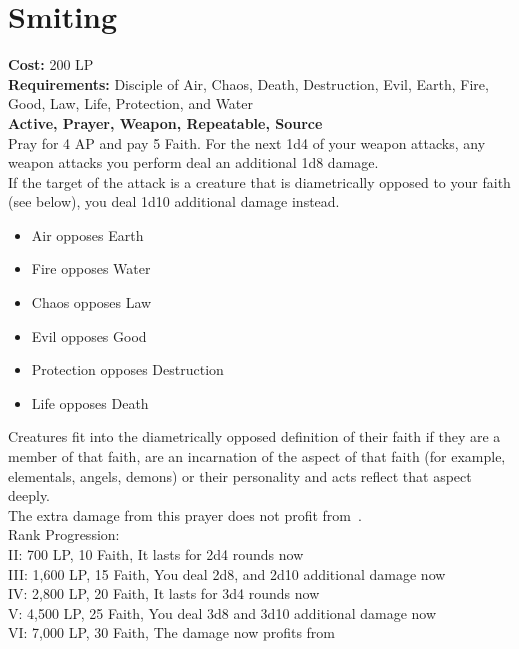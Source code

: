 \section{Smiting}\label{prayer:smiting}
\textbf{Cost:} 200 LP\\
\textbf{Requirements:} Disciple of Air, Chaos, Death, Destruction, Evil, Earth, Fire, Good, Law, Life, Protection, and Water\\
\textbf{Active, Prayer, Weapon, Repeatable, Source}\\
Pray for 4 AP and pay 5 Faith.
For the next 1d4 of your weapon attacks, any weapon attacks you perform deal an additional 1d8 damage.\\
If the target of the attack is a creature that is diametrically opposed to your faith (see below), you deal 1d10 additional damage instead.\\
\begin{itemize}
    \item Air opposes Earth
    \item Fire opposes Water
    \item Chaos opposes Law
    \item Evil opposes Good
    \item Protection opposes Destruction
    \item Life opposes Death
\end{itemize}
Creatures fit into the diametrically opposed definition of their faith if they are a member of that faith, are an incarnation of the aspect of that faith (for example, elementals, angels, demons) or their personality and acts reflect that aspect deeply.\\
The extra damage from this prayer does not profit from~.
\\
Rank Progression:\\
II: 700 LP, 10 Faith, It lasts for 2d4 rounds now\\
III: 1,600 LP, 15 Faith, You deal 2d8, and 2d10 additional damage now\\
IV: 2,800 LP, 20 Faith, It lasts for 3d4 rounds now\\
V: 4,500 LP, 25 Faith, You deal 3d8 and 3d10 additional damage now\\
VI: 7,000 LP, 30 Faith, The damage now profits from ~\\